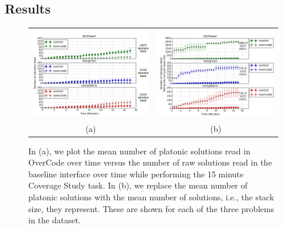 \subsection{Results} \label{coverageResults}
\begin{figure}[b!]
\begin{tabular}{c | c}
\begin{minipage}{.5\linewidth}
\centering
\includegraphics[width=\linewidth]{Body/figures/overcode/prettyReadCoverage.png}
\end{minipage}
&
\begin{minipage}{.5\linewidth}
\centering
\includegraphics[width=\linewidth]{Body/figures/overcode/prettyPercentCoverage.png}
\end{minipage}
\\
(a) & (b)
\end{tabular}
\caption{In (a), we plot the mean number of platonic solutions read in OverCode over time versus the number of raw solutions read in the baseline interface over time while performing the 15 minute Coverage Study task. In (b), we replace the mean number of platonic solutions with the mean number of solutions, i.e., the stack size, they represent. These are shown for each of the three problems in the dataset.}
\label{readCoverage}
\end{figure}
